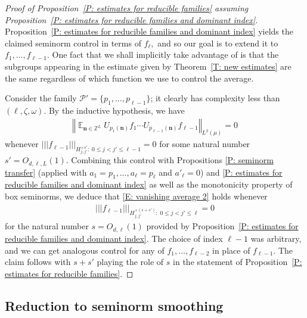 \documentclass[11pt]{amsart}
\theoremstyle{definition}
\DeclareMathOperator*{\E}{\mathbb{E}}
\newcommand{\Z}{{\mathbb Z}}
\newcommand{\CP}{{\mathcal P}}
\newcommand{\bn}{{\mathbf{n}}}
\newcommand{\norm}[1]{\left\Vert #1\right\Vert}
\newcommand{\nnorm}[1]{\lvert\!|\!| #1|\!|\!\rvert}
\newcommand{\1}{{\mathbf{1}}}
\begin{document}
\begin{proof}[Proof of Proposition~\ref{P: estimates for reducible families} assuming Proposition~\ref{P: estimates for reducible families and dominant index}]
Proposition~\ref{P: estimates for reducible families and dominant index} yields the claimed seminorm control in terms of $f_\ell,$ and so our goal is to extend it to $f_1, \ldots, f_{\ell-1}$. One fact that we shall implicitly take advantage of is that the subgroups appearing in the estimate given by Theorem~\ref{T: new estimates} are the same regardless of which function we use to control the average.

Consider the family $\CP'=\{p_1, \ldots, p_{\ell-1}\}$; it clearly has complexity less than $(\ell, \zeta, \omega)$. By the inductive hypothesis, we have
\begin{align*}
        \norm{\E_{\bn\in\Z^{L}} U_{p_1(\bn)}f_1\cdots U_{p_{\ell-1}(\bn)}f_{\ell-1}}_{L^2(\mu)} = 0
    \end{align*}
    whenever $\nnorm{f_{\ell-1}}_{H_{j,{j'}}^{\times s'}\colon\; 0\leq j<{j'}\leq \ell-1} = 0$ for some natural number $s'=O_{d,\ell,L}(1)$.
Combining this control with Propositions \ref{P: seminorm transfer} (applied with $a_1 = p_1, \ldots, a_\ell = p_\ell$ and $a'_\ell = 0$) and \ref{P: estimates for reducible families and dominant index} as well as the monotonicity property of box seminorms, we deduce that \eqref{E: vanishing average 2} holds whenever
\begin{align*}
    \nnorm{f_{\ell-1}}_{H_{j,{j'}}^{\times (s+s')}\colon\; 0\leq j<{j'}\leq \ell} = 0
\end{align*}
for the natural number $s=O_{d,\ell}(1)$ provided by Proposition~\ref{P: estimates for reducible families and dominant index}. The choice of index $\ell-1$ was arbitrary, and we can get analogous control for any of $f_1, \ldots, f_{\ell-2}$ in place of $f_{\ell-1}$. The claim follows with $s+s'$ playing the role of $s$ in the statement of Proposition~\ref{P: estimates for reducible families}.
\end{proof}

\subsection{Reduction to seminorm smoothing}
\end{document}
